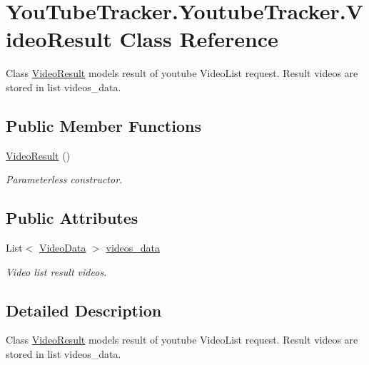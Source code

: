 \hypertarget{class_you_tube_tracker_1_1_youtube_tracker_1_1_video_result}{}\section{You\+Tube\+Tracker.\+Youtube\+Tracker.\+Video\+Result Class Reference}
\label{class_you_tube_tracker_1_1_youtube_tracker_1_1_video_result}


Class {\ttfamily \mbox{\hyperlink{class_you_tube_tracker_1_1_youtube_tracker_1_1_video_result}{Video\+Result}}} models result of youtube Video\+List request. Result videos are stored in list {\ttfamily videos\+\_\+data}.  


\subsection*{Public Member Functions}
\begin{DoxyCompactItemize}
\item 
\mbox{\hyperlink{class_you_tube_tracker_1_1_youtube_tracker_1_1_video_result_a6b681268664a1705f678db0444d0304b}{Video\+Result}} ()
\begin{DoxyCompactList}\small\item\em Parameterless constructor. \end{DoxyCompactList}\end{DoxyCompactItemize}
\subsection*{Public Attributes}
\begin{DoxyCompactItemize}
\item 
List$<$ \mbox{\hyperlink{struct_you_tube_tracker_1_1_video_data}{Video\+Data}} $>$ \mbox{\hyperlink{class_you_tube_tracker_1_1_youtube_tracker_1_1_video_result_a6939c5928302095e392762ace6454018}{videos\+\_\+data}}
\begin{DoxyCompactList}\small\item\em Video list result videos. \end{DoxyCompactList}\end{DoxyCompactItemize}


\subsection{Detailed Description}
Class {\ttfamily \mbox{\hyperlink{class_you_tube_tracker_1_1_youtube_tracker_1_1_video_result}{Video\+Result}}} models result of youtube Video\+List request. Result videos are stored in list {\ttfamily videos\+\_\+data}. 



